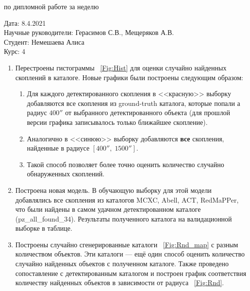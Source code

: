 \documentclass{article}
\begin{document}
\begin{center}{ по дипломной работе за неделю\\}\end{center}
Дата: 8.4.2021\\
Научные руководители: Герасимов С.В., Мещеряков А.В.\\
Студент: Немешаева Алиса\\
Курс: 4\\

\renewcommand{\labelitemi}{$\blacksquare$}
\renewcommand\labelitemii{$\square$}
\begin{enumerate}
    \item Перестроены гистограммы ~\ref{Fig:Hist} для оценки случайно найденных скоплений в 
        каталоге. Новые графики были построены следующим образом:\\
        \begin{enumerate}
            \item Для каждого детектированного скопления в <<красную>> выборку добавляются все 
                скопления из ground-truth каталога, которые попали а радиус $400''$ от выбранного 
                детектированного объекта (для прошлой версии графика записывалось только ближайшее
                скопление).\\
            \item Аналогично в <<синюю>> выборку добавляются \textbf{все} скопления, найденные в 
                радиусе $[400'',\; 1500'']$.\\
            \item Такой способ позволяет более точно оценить количество случайно обнаруженных 
                скоплений.\\
        \end{enumerate}
    \item Построена новая модель. В обучающую выборку для этой модели добавлялись все скопления из 
        каталогов MCXC, Abell, ACT, RedMaPPer, что были найдены в самом удачном детектированном 
        каталоге (pz\_all\_found\_34). Результаты полученного каталога на валидационной выборке в
        таблице.\\
    \item Построены случайно сгенерированные каталоги ~\ref{Fig:Rnd_map} с разным количеством 
        объектов. Эти каталоги --- ещё один способ оценить количество случайно найденных объектов 
        с полученном каталоге. Также проведено сопоставление с детектированным каталогом и 
        построен график соответствия количеству найденных объектов в зависимости от радиуса 
        ~\ref{Fig:Rnd}.\\
\end{enumerate}
\end{document}

